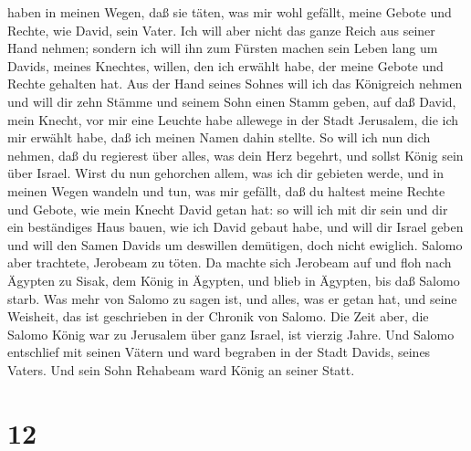 haben in meinen Wegen, daß sie täten, was mir wohl gefällt, meine Gebote
und Rechte, wie David, sein Vater.  Ich will aber nicht das
ganze Reich aus seiner Hand nehmen; sondern ich will ihn zum Fürsten
machen sein Leben lang um Davids, meines Knechtes, willen, den ich
erwählt habe, der meine Gebote und Rechte gehalten hat. 
Aus der Hand seines Sohnes will ich das Königreich nehmen und will dir
zehn Stämme  und seinem Sohn einen Stamm geben, auf daß
David, mein Knecht, vor mir eine Leuchte habe allewege in der Stadt
Jerusalem, die ich mir erwählt habe, daß ich meinen Namen dahin stellte.
 So will ich nun dich nehmen, daß du regierest über alles,
was dein Herz begehrt, und sollst König sein über Israel. 
Wirst du nun gehorchen allem, was ich dir gebieten werde, und in meinen
Wegen wandeln und tun, was mir gefällt, daß du haltest meine Rechte und
Gebote, wie mein Knecht David getan hat: so will ich mit dir sein und
dir ein beständiges Haus bauen, wie ich David gebaut habe, und will dir
Israel geben  und will den Samen Davids um deswillen
demütigen, doch nicht ewiglich.  Salomo aber trachtete,
Jerobeam zu töten. Da machte sich Jerobeam auf und floh nach Ägypten zu
Sisak, dem König in Ägypten, und blieb in Ägypten, bis daß Salomo starb.
 Was mehr von Salomo zu sagen ist, und alles, was er getan
hat, und seine Weisheit, das ist geschrieben in der Chronik von Salomo.
 Die Zeit aber, die Salomo König war zu Jerusalem über ganz
Israel, ist vierzig Jahre.  Und Salomo entschlief mit
seinen Vätern und ward begraben in der Stadt Davids, seines Vaters. Und
sein Sohn Rehabeam ward König an seiner Statt.

\hypertarget{section-11}{%
\section{12}\label{section-11}}

